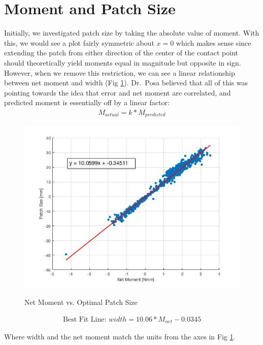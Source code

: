\documentclass{article}
\begin{document}
\section{Moment and Patch Size}
\noindent Initially, we investigated patch size by taking the absolute value of moment. With this, we would see a plot fairly symmetric about $x = 0$ which makes sense since extending the patch from either direction of the center of the contact point should theoretically yield moments equal in magnitude but opposite in sign. However, when we remove this restriction, we can see a linear relationship between net moment and width (Fig \ref{fig:momentPSize}). Dr.\ Posa believed that all of this was pointing towards the idea that error and net moment are correlated, and predicted moment is essentially off by a linear factor:
\begin{align}
    M_{actual} = k * M_{predicted}
\end{align}

\begin{figure}[h!]
\centering
\caption{Net Moment vs. Optimal Patch Size}
\includegraphics[scale=0.55]{momentPSize}
\label{fig:momentPSize}
\end{figure}

\begin{align}
    \mbox{Best Fit Line: } width = 10.06 * M_{net} - 0.0345
\end{align}
\begin{center}
    Where width and the net moment match the units from the axes in Fig \ref{fig:momentPSize}.
\end{center}
\end{document}

